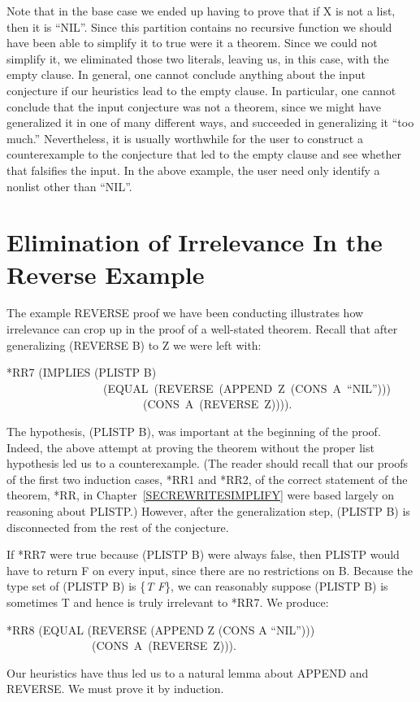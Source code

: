 \documentclass[10pt]{book}
\newenvironment{pubasis}{\begin{flushleft}}{\end{flushleft}}
\begin{document}
Note that in the base case we ended up having to prove that
if X is not a list, then it is ``NIL''.  Since this partition contains no recursive
function we should have been able to simplify it to true were it a theorem.
Since we could not simplify it, we eliminated those two literals,
leaving us, in this case, with the empty clause.
In general, one cannot conclude anything about the input conjecture
if our heuristics lead to the empty clause.  In particular, one cannot
conclude that the input conjecture was not a theorem, since we might have
generalized it in one of many different ways, and succeeded in generalizing
it ``too much.''  Nevertheless, it is usually worthwhile for the user to 
construct a counterexample to the conjecture that led to the empty clause
and see whether that falsifies the input.  In the above example,
the user need only identify a nonlist other than ``NIL''.

\section{Elimination of Irrelevance In the Reverse Example}
The example REVERSE proof we have been conducting illustrates
how irrelevance can crop up in the proof of a well-stated theorem.
Recall that after generalizing (REVERSE B) to Z we were left with:

\begin{pubasis}
*RR7    (IMPLIES (PLISTP B)\\
~~~~~~~~~~~~~~~~~(EQUAL~(REVERSE~(APPEND~Z~(CONS~A~``NIL'')))\\
~~~~~~~~~~~~~~~~~~~~~~~~(CONS~A~(REVERSE~Z)))).\\
\end{pubasis}
The hypothesis, (PLISTP B), was important at the beginning of the
proof.  Indeed, the above attempt at proving the theorem
without the proper list hypothesis led us to a counterexample.
(The reader should recall that our proofs of the first
two induction cases,
*RR1 and *RR2, of the correct statement of the theorem, *RR, 
in Chapter~\ref{SECREWRITESIMPLIFY}
were based largely
on reasoning about PLISTP.)  However, after the generalization
step, (PLISTP B) is disconnected from the rest of the conjecture.

If *RR7 were true because (PLISTP B) were always false, then PLISTP
would have to return F on every input, since there are no restrictions on B.
Because the type set of (PLISTP B) is \{\emph{T} \emph{F}\},
we can reasonably suppose (PLISTP B) is sometimes T
and hence is truly irrelevant to *RR7.  We produce:
\begin{pubasis}
*RR8	(EQUAL (REVERSE (APPEND Z (CONS A ``NIL'')))\\
~~~~~~~~~~~~~~~(CONS~A~(REVERSE~Z))).\\
\end{pubasis}
Our heuristics have thus led us to 
a natural lemma about APPEND and REVERSE.  We must
prove it by induction.
\end{document}

